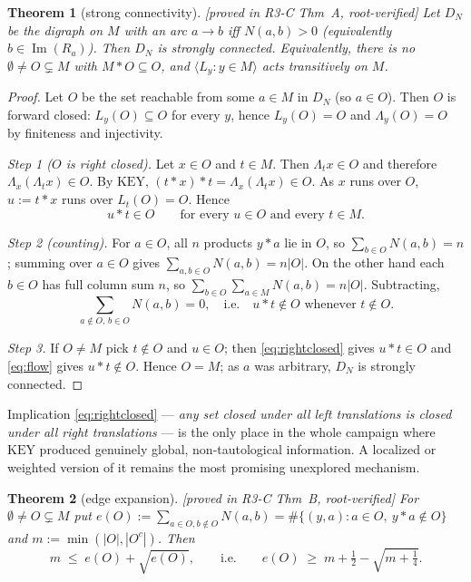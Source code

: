 \documentclass[11pt]{article}
\theoremstyle{plain}
\newtheorem{theorem}{Theorem}[section]
\theoremstyle{definition}
\theoremstyle{remark}
\numberwithin{equation}{section}
\newcommand{\op}{\mathbin{*}}
\newcommand{\Imm}{\operatorname{Im}}
\newcommand{\statusbox}[1]{{\small\sloppy\textsf{[#1]}}}
\newcommand{\PROVED}[1]{\statusbox{proved in #1, root-verified}}
\begin{document}
\begin{theorem}[strong connectivity]\label{thm:A}
\PROVED{R3-C Thm~A}
Let $D_N$ be the digraph on $M$ with an arc $a\to b$ iff $N(a,b)>0$ (equivalently
$b\in\Imm(R_a)$). Then $D_N$ is strongly connected. Equivalently, there is no
$\emptyset \ne O \subsetneq M$ with $M\op O \subseteq O$, and $\langle L_y : y\in M\rangle$
acts transitively on $M$.
\end{theorem}

\begin{proof}
Let $O$ be the set reachable from some $a\in M$ in $D_N$ (so $a\in O$). Then $O$ is forward
closed: $L_y(O)\subseteq O$ for every $y$, hence $L_y(O) = O$ and $\Lambda_y(O) = O$ by
finiteness and injectivity.

\emph{Step 1 ($O$ is right closed).} Let $x\in O$ and $t\in M$. Then $\Lambda_t x\in O$ and
therefore $\Lambda_x(\Lambda_t x)\in O$. By $\mathrm{KEY}$,
$(t\op x)\op t = \Lambda_x(\Lambda_t x)\in O$. As $x$ runs over $O$, $u := t\op x$ runs over
$L_t(O) = O$. Hence
\begin{equation}\label{eq:rightclosed}
  u \op t \in O \qquad \text{for every } u\in O \text{ and every } t\in M .
\end{equation}

\emph{Step 2 (counting).} For $a\in O$, all $n$ products $y\op a$ lie in $O$, so
$\sum_{b\in O} N(a,b) = n$; summing over $a\in O$ gives $\sum_{a,b\in O} N(a,b) = n|O|$. On
the other hand each $b\in O$ has full column sum $n$, so
$\sum_{b\in O}\sum_{a\in M} N(a,b) = n|O|$. Subtracting,
\begin{equation}\label{eq:flow}
  \sum_{a\notin O,\, b\in O} N(a,b) = 0, \quad\text{i.e.}\quad
  u\op t\notin O \text{ whenever } t\notin O .
\end{equation}

\emph{Step 3.} If $O\ne M$ pick $t\notin O$ and $u\in O$; then \eqref{eq:rightclosed} gives
$u\op t\in O$ and \eqref{eq:flow} gives $u\op t\notin O$. Hence $O = M$; as $a$ was
arbitrary, $D_N$ is strongly connected.
\end{proof}

Implication \eqref{eq:rightclosed} --- \emph{any set closed under all left translations is
closed under all right translations} --- is the only place in the whole campaign where
$\mathrm{KEY}$ produced genuinely global, non-tautological information. A localized or
weighted version of it remains the most promising unexplored mechanism.

\begin{theorem}[edge expansion]\label{thm:B}
\PROVED{R3-C Thm~B}
For $\emptyset\ne O\subsetneq M$ put
$e(O) := \sum_{a\in O, b\notin O} N(a,b) = \#\{(y,a) : a\in O,\ y\op a\notin O\}$ and
$m := \min(|O|,|O^{c}|)$. Then
\[
  m \;\le\; e(O) + \sqrt{e(O)}, \qquad\text{i.e.}\qquad
  e(O) \;\ge\; m + \tfrac12 - \sqrt{m+\tfrac14}.
\]
\end{theorem}
\end{document}
